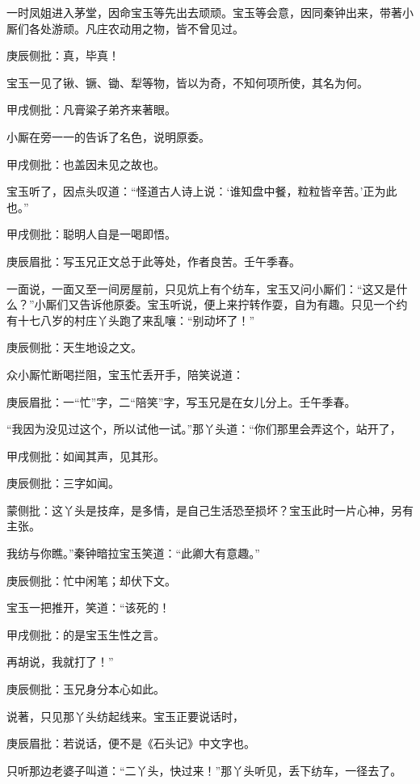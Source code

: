 \begin{parag}


    一时凤姐进入茅堂，因命宝玉等先出去顽顽。宝玉等会意，因同秦钟出来，带著小厮们各处游顽。凡庄农动用之物，皆不曾见过。\begin{note}庚辰侧批：真，毕真！\end{note}宝玉一见了锹、镢、锄、犁等物，皆以为奇，不知何项所使，其名为何。\begin{note}甲戌侧批：凡膏粱子弟齐来著眼。\end{note}小厮在旁一一的告诉了名色，说明原委。\begin{note}甲戌侧批：也盖因未见之故也。\end{note}宝玉听了，因点头叹道：“怪道古人诗上说：‘谁知盘中餐，粒粒皆辛苦。’正为此也。”\begin{note}甲戌侧批：聪明人自是一喝即悟。\end{note}\begin{note}庚辰眉批：写玉兄正文总于此等处，作者良苦。壬午季春。\end{note}一面说，一面又至一间房屋前，只见炕上有个纺车，宝玉又问小厮们：“这又是什么？”小厮们又告诉他原委。宝玉听说，便上来拧转作耍，自为有趣。只见一个约有十七八岁的村庄丫头跑了来乱嚷：“别动坏了！”\begin{note}庚辰侧批：天生地设之文。\end{note}众小厮忙断喝拦阻，宝玉忙丢开手，陪笑说道：\begin{note}庚辰眉批：一“忙”字，二“陪笑”字，写玉兄是在女儿分上。壬午季春。\end{note}“我因为没见过这个，所以试他一试。”那丫头道：“你们那里会弄这个，站开了，\begin{note}甲戌侧批：如闻其声，见其形。\end{note}\begin{note}庚辰侧批：三字如闻。\end{note}\begin{note}蒙侧批：这丫头是技痒，是多情，是自己生活恐至损坏？宝玉此时一片心神，另有主张。\end{note}我纺与你瞧。”秦钟暗拉宝玉笑道：“此卿大有意趣。”\begin{note}庚辰侧批：忙中闲笔；却伏下文。\end{note}宝玉一把推开，笑道：“该死的！\begin{note}甲戌侧批：的是宝玉生性之言。\end{note}再胡说，我就打了！”\begin{note}庚辰侧批：玉兄身分本心如此。\end{note}说著，只见那丫头纺起线来。宝玉正要说话时，\begin{note}庚辰眉批：若说话，便不是《石头记》中文字也。\end{note}只听那边老婆子叫道：“二丫头，快过来！”那丫头听见，丢下纺车，一径去了。
\end{parag}


